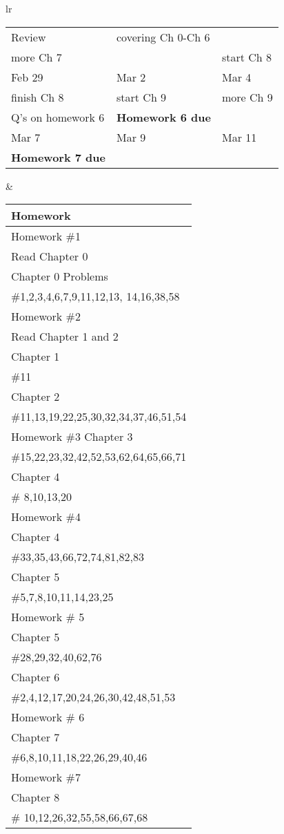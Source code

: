 \documentclass[11pt]{article}
\begin{document}
\begin{tabular}{lr}
\begin{tabular}{|l|l|l|}
Review &covering Ch 0-Ch 6&\\
more Ch 7&&start Ch 8\\
\hline
Feb 29 & Mar 2 & Mar 4 \\
finish Ch 8 & start Ch 9& more Ch 9\\
Q's on homework 6&\textbf{Homework  6 due}&\\
\hline
Mar 7 & Mar 9 & Mar 11\\
\textbf{Homework 7 due}&&\\
\hline
\end{tabular}
&
\begin{tabular}{|p{6cm}|}
\hline
Homework \\
\hline \hline
Homework \#1\\
Read Chapter 0\\
Chapter 0 Problems\\
\#1,2,3,4,6,7,9,11,12,13, 14,16,38,58\\
\hline
Homework \#2\\
Read Chapter 1 and 2\\
Chapter 1\\
\#11\\
Chapter 2\\
\#11,13,19,22,25,30,32,34,37,46,51,54\\
\hline
Homework \#3
Chapter 3\\
\#15,22,23,32,42,52,53,62,64,65,66,71\\
Chapter 4\\
\# 8,10,13,20 \\
\hline
Homework \#4\\
Chapter 4\\
\#33,35,43,66,72,74,81,82,83\\
Chapter 5\\
\#5,7,8,10,11,14,23,25\\
\hline
Homework \# 5\\
Chapter 5\\
\#28,29,32,40,62,76\\
Chapter 6\\
\#2,4,12,17,20,24,26,30,42,48,51,53\\
\hline
Homework \# 6\\
Chapter 7\\
\#6,8,10,11,18,22,26,29,40,46\\
\hline
Homework \#7\\
Chapter 8\\
\# 10,12,26,32,55,58,66,67,68\\
\hline
\end{tabular}
\end{tabular}
\end{document}
